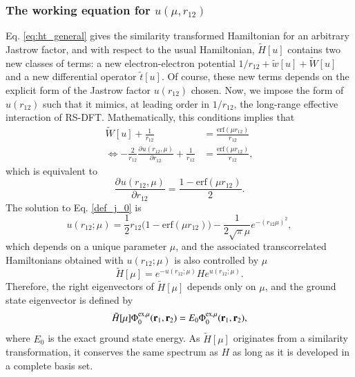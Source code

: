 \documentclass[aip,jcp,reprint,noshowkeys,superscriptaddress]{revtex4-1}
\newcommand{\deriv}[3]{\frac{\partial^{#3} #1}{\partial {#2}^{#3}}}
\newcommand{\br}[0]{{\bf {r}}}
\newcommand{\phimu}[0]{\Phi^{\text{ex},\mu}_0}
\begin{document}
\subsubsection{The working equation for $u(\mu,r_{12})$ }
Eq. \eqref{eq:ht_general} gives the similarity transformed Hamiltonian for an arbitrary Jastrow factor, 
and with respect to the usual Hamiltonian, $\tilde{H}[u]$ contains two new classes of terms: 
a new electron-electron potential $1/r_{12} + \tilde{w}[u]+ \tilde{W}[u]$ and a new differential operator  $\tilde{t}[u]$. 
Of course, these new terms depends on the explicit form of the Jastrow factor $u(r_{12})$ chosen. 
Now, we impose the form of $u(r_{12})$ such that it mimics, at leading order in $1/r_{12}$, the long-range effective interaction of RS-DFT. 
Mathematically, this conditions implies that 
\begin{equation}
 \begin{aligned}
 \label{def_j_00}
 \tilde{W}[u] + \frac{1}{r_{12}}&= \frac{\text{erf}(\mu r_{12})}{r_{12}} \\ 
\Leftrightarrow -\frac{2}{r_{12}} \deriv{u(r_{12},\mu)}{r_{12}}{} + \frac{1}{r_{12}} & = \frac{\text{erf}(\mu r_{12})}{r_{12}}, 
 \end{aligned}
\end{equation}
which is equivalent to 
\begin{equation}
 \label{def_j_0}
 \deriv{u(r_{12},\mu)}{r_{12}}{} = \frac{1 - \text{erf}(\mu r_{12})}{2}.
\end{equation}
The solution to Eq. \eqref{def_j_0} is 
\begin{equation}
 \label{eq:def_j}
 u(r_{12};\mu) = \frac{1}{2}r_{12}\bigg( 1 - \text{erf}(\mu r_{12})  \bigg) - \frac{1}{2\sqrt{\pi}\mu}e^{-(r_{12}\mu)^2},
\end{equation}
which depends on a unique parameter $\mu$, 
and the associated transcorrelated Hamiltonians obtained with $u(r_{12};\mu)$ is also controlled by $\mu$
\begin{equation}
 \label{eq:def_ht_mu}
 \tilde{H}[\mu] = e^{-u(r_{12};\mu)} H e^{u(r_{12};\mu)}. 
\end{equation}
Therefore, the right eigenvectors of $\tilde{H}[\mu]$ depends only on $\mu$, and the ground state eigenvector is defined by 
\begin{equation}
 \tilde{H}[\mu] \phimu(\br{}_{1},\br{}_{2}) = E_0 \phimu(\br{}_{1},\br{}_{2}), 
\end{equation}
where $E_0$ is the exact ground state energy. 
As $\tilde{H}[\mu]$ originates from a similarity transformation, it conserves the same spectrum as $H$ as long as it is developed in a complete basis set. 
\end{document}
